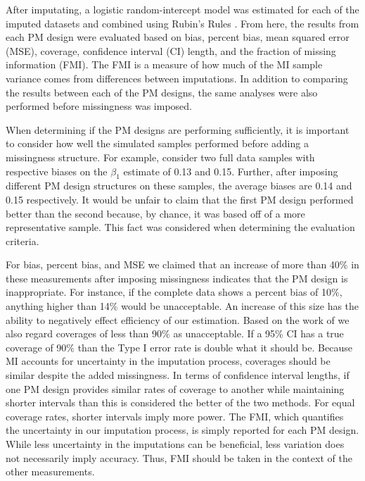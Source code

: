 \documentclass{svjour3}                     %
\begin{document}
After imputating, a logistic random-intercept model was estimated for each of the imputed datasets and combined using Rubin's Rules \citep{rubin2004multiple}. From here, the results from each PM design were evaluated based on bias, percent bias, mean squared error (MSE), coverage, confidence interval (CI) length, and the fraction of missing information (FMI). The FMI is a measure of how much of the MI sample variance comes from differences between imputations. In addition to comparing the results between each of the PM designs, the same analyses were also performed before missingness was imposed. \par

When determining if the PM designs are performing sufficiently, it is important to consider how well the simulated samples performed before adding a missingness structure. For example, consider two full data samples with respective biases on the $\beta_1$ estimate of 0.13 and 0.15. Further, after imposing different PM design structures on these samples, the average biases are 0.14 and 0.15 respectively. It would be unfair to claim that the first PM design performed better than the second because, by chance, it was based off of a more representative sample. This fact was considered when determining the evaluation criteria. \par

For bias, percent bias, and MSE we claimed that an increase of more than 40\% in these measurements after imposing missingness indicates that the PM design is inappropriate. For instance, if the complete data shows a percent bias of 10\%, anything higher than 14\% would be unacceptable. An increase of this size has the ability to negatively effect efficiency of our estimation. Based on the work of \citet{collins2001comparison} we also regard coverages of less than 90\% as unacceptable. If a 95\% CI has a true coverage of 90\% than the Type I error rate is double what it should be. Because MI accounts for uncertainty in the imputation process, coverages should be similar despite the added missingness. In terms of confidence interval lengths, if one PM design provides similar rates of coverage to another while maintaining shorter intervals than this is considered the better of the two methods. For equal coverage rates, shorter intervals imply more power. The FMI, which quantifies the uncertainty in our imputation process, is simply reported for each PM design. While less uncertainty in the imputations can be beneficial, less variation does not necessarily imply accuracy. Thus, FMI should be taken in the context of the other measurements. \par
\end{document}
